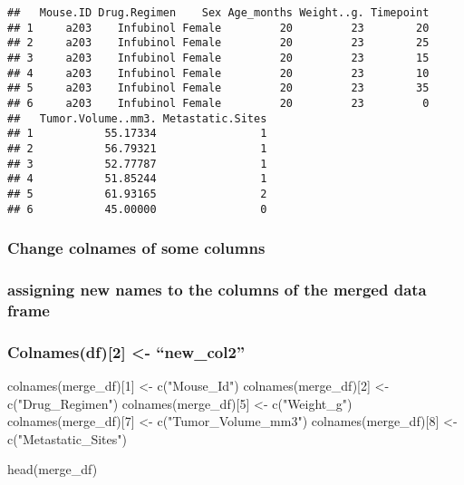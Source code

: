 \documentclass[
]{article}
\newenvironment{Shaded}{\begin{snugshade}}{\end{snugshade}}
\newcommand{\DecValTok}[1]{\textcolor[rgb]{0.00,0.00,0.81}{#1}}
\newcommand{\FunctionTok}[1]{\textcolor[rgb]{0.00,0.00,0.00}{#1}}
\newcommand{\NormalTok}[1]{#1}
\newcommand{\OtherTok}[1]{\textcolor[rgb]{0.56,0.35,0.01}{#1}}
\newcommand{\StringTok}[1]{\textcolor[rgb]{0.31,0.60,0.02}{#1}}
\begin{document}
\begin{verbatim}
##   Mouse.ID Drug.Regimen    Sex Age_months Weight..g. Timepoint
## 1     a203    Infubinol Female         20         23        20
## 2     a203    Infubinol Female         20         23        25
## 3     a203    Infubinol Female         20         23        15
## 4     a203    Infubinol Female         20         23        10
## 5     a203    Infubinol Female         20         23        35
## 6     a203    Infubinol Female         20         23         0
##   Tumor.Volume..mm3. Metastatic.Sites
## 1           55.17334                1
## 2           56.79321                1
## 3           52.77787                1
## 4           51.85244                1
## 5           61.93165                2
## 6           45.00000                0
\end{verbatim}

\hypertarget{change-colnames-of-some-columns}{%
\subsubsection{Change colnames of some
columns}\label{change-colnames-of-some-columns}}

\hypertarget{assigning-new-names-to-the-columns-of-the-merged-data-frame}{%
\subsubsection{assigning new names to the columns of the merged data
frame}\label{assigning-new-names-to-the-columns-of-the-merged-data-frame}}

\hypertarget{colnamesdf2---new_col2}{%
\subsubsection{Colnames(df){[}2{]} \textless-
``new\_col2''}\label{colnamesdf2---new_col2}}

\begin{Shaded}
\begin{Highlighting}[]
\FunctionTok{colnames}\NormalTok{(merge\_df)[}\DecValTok{1}\NormalTok{] }\OtherTok{\textless{}{-}} \FunctionTok{c}\NormalTok{(}\StringTok{"Mouse\_Id"}\NormalTok{)}
\FunctionTok{colnames}\NormalTok{(merge\_df)[}\DecValTok{2}\NormalTok{] }\OtherTok{\textless{}{-}} \FunctionTok{c}\NormalTok{(}\StringTok{"Drug\_Regimen"}\NormalTok{)}
\FunctionTok{colnames}\NormalTok{(merge\_df)[}\DecValTok{5}\NormalTok{] }\OtherTok{\textless{}{-}} \FunctionTok{c}\NormalTok{(}\StringTok{"Weight\_g"}\NormalTok{)}
\FunctionTok{colnames}\NormalTok{(merge\_df)[}\DecValTok{7}\NormalTok{] }\OtherTok{\textless{}{-}} \FunctionTok{c}\NormalTok{(}\StringTok{"Tumor\_Volume\_mm3"}\NormalTok{)}
\FunctionTok{colnames}\NormalTok{(merge\_df)[}\DecValTok{8}\NormalTok{] }\OtherTok{\textless{}{-}} \FunctionTok{c}\NormalTok{(}\StringTok{"Metastatic\_Sites"}\NormalTok{)}

\FunctionTok{head}\NormalTok{(merge\_df)}
\end{Highlighting}
\end{Shaded}
\end{document}

